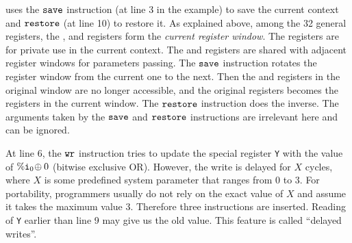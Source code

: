 \sparc{} uses the $\texttt{save}$ instruction (at line 3 in the example)
to save the current context
and $\texttt{restore}$ (at line 10) to restore it.
As explained above, among the 32 general registers,
the \outRN{}, \localRN{} and \inRN{} registers form the
{\em current register window}.
The \localRN{} registers are for private use in the current context.
The \inRN{} and \outRN{} registers are shared with adjacent register windows
for parameters passing.
The $\texttt{save}$ instruction rotates the register window from the
current one to the next. Then the \localRN{} and \inRN{}
registers in the original window are no longer accessible,
and the original \outRN{} registers becomes the \inRN{} registers
in the current window.
The $\texttt{restore}$ instruction does the inverse.
The arguments taken by the $\texttt{save}$ and  $\texttt{restore}$ instructions
are irrelevant here and can be ignored.


At line 6, the $\texttt{wr}$ instruction tries to
update the special register {\tt Y}
with the value of $\%\texttt{i}_{0} \! \oplus 0$
(bitwise exclusive OR).
However, the write is delayed for $X$ cycles,
where $X$ is some predefined system parameter
that ranges from 0 to 3.
For portability, programmers usually do not rely
on the exact value of $X$ and assume it takes
the maximum value 3.
Therefore three \nop{} instructions
are inserted.
Reading of {\tt Y} earlier than line 9
may give us the old value.
This feature is called ``delayed writes''.

